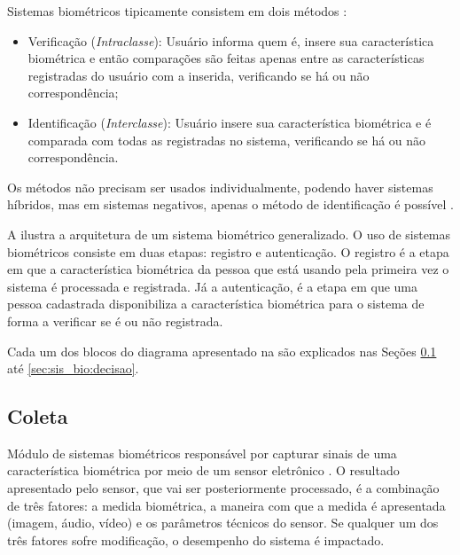 \par Sistemas biométricos tipicamente consistem em dois métodos \cite{wayman2005biometric}:

\begin{itemize}
    \item Verificação (\textit{Intraclasse}): Usuário informa quem é, insere sua característica biométrica e então comparações são feitas apenas entre as características registradas do usuário com a inserida, verificando se há ou não correspondência;
    \item Identificação (\textit{Interclasse}): Usuário insere sua característica biométrica e é comparada com todas as registradas no sistema, verificando se há ou não correspondência.
\end{itemize}

\par Os métodos não precisam ser usados individualmente, podendo haver sistemas híbridos, mas em sistemas negativos, apenas o método de identificação é possível \cite{wayman2005biometric}.

\par A  ilustra a arquitetura de um sistema biométrico generalizado. O uso de sistemas biométricos consiste em duas etapas: registro e autenticação. O registro é a etapa em que a característica biométrica da pessoa que está usando pela primeira vez o sistema é processada e registrada. Já a autenticação, é a etapa em que uma pessoa cadastrada disponibiliza a característica biométrica para o sistema de forma a verificar se é ou não registrada.

\par Cada um dos blocos do diagrama apresentado na  são explicados nas Seções \ref{sec:sis_bio:coleta} até \ref{sec:sis_bio:decisao}.


\subsection{Coleta} \label{sec:sis_bio:coleta}

\par Módulo de sistemas biométricos responsável por capturar sinais de uma característica biométrica por meio de um sensor eletrônico \cite{wayman2005biometric}. O resultado apresentado pelo sensor, que vai ser posteriormente processado, é a combinação de três fatores: a medida biométrica, a maneira com que a medida é apresentada (imagem, áudio, vídeo) e os parâmetros técnicos do sensor. Se qualquer um dos três fatores sofre modificação, o desempenho do sistema é impactado.

